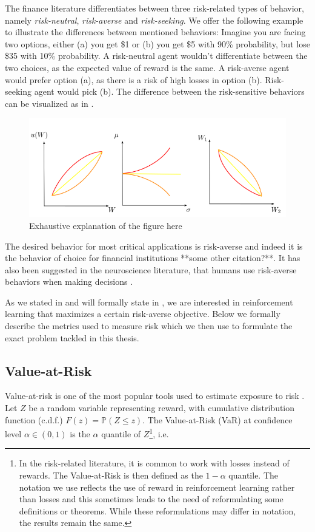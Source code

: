The finance literature differentiates between three risk-related types of behavior, namely \textit{risk-neutral}, \textit{risk-averse} and \textit{risk-seeking}. We offer the following example to illustrate the differences between mentioned behaviors: Imagine you are facing two options, either (a) you get \$1 or (b) you get \$5 with 90\% probability, but lose \$35 with 10\% probability. A risk-neutral agent wouldn't differentiate between the two choices, as the expected value of reward is the same. A risk-averse agent would prefer option (a), as there is a risk of high losses in option (b). Risk-seeking agent would pick (b). The difference between the risk-sensitive behaviors can be visualized as in .

\begin{figure}
\center
\includegraphics[width=\linewidth]{gfx/risk_behavior.png}
\caption{Exhaustive explanation of the figure here}
\label{fig:prelim:risk}
\end{figure}

The desired behavior for most critical applications is risk-averse and indeed it is the behavior of choice for financial institutions **some other citation?**\citep{basel2013fundamental}. It has also been suggested in the neuroscience literature, that humans use risk-averse behaviors when making decisions \citep{shen2014risk}.

As we stated in  and will formally state in , we are interested in reinforcement learning that maximizes a certain risk-averse objective. Below we formally describe the metrics used to measure risk which we then use to formulate the exact problem tackled in this thesis.


\subsection{Value-at-Risk}

Value-at-risk \citep{wipplinger2007philippe} is one of the most popular tools used to estimate exposure to risk .
Let $Z$ be a random variable representing reward, with cumulative distribution function (c.d.f.) $F(z) = \mathbb{P}(Z \le z)$.
The Value-at-Risk (VaR) at confidence level $\alpha \in (0,1)$ is the $\alpha$ quantile of $Z$\footnote{In the risk-related literature, it is common to work with losses instead of rewards. The Value-at-Risk is then defined as the $1-\alpha$ quantile. The notation we use reflects the use of reward in reinforcement learning rather than losses and this sometimes leads to the need of reformulating some definitions or theorems. While these reformulations may differ in notation, the results remain the same.}, i.e. 

